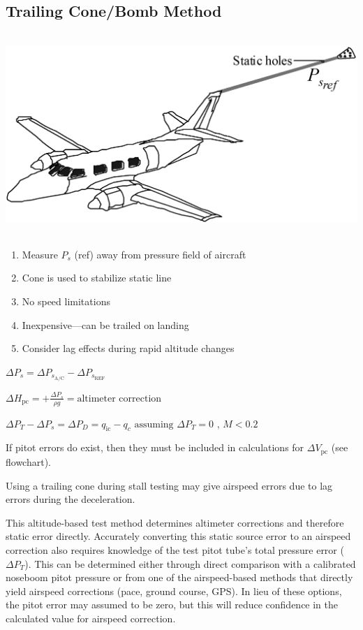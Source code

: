 \documentclass[
]{book}
\providecommand{\tightlist}{%
  \setlength{\itemsep}{0pt}\setlength{\parskip}{0pt}}
\begin{document}
\hypertarget{trailing-conebomb-method}{%
\subsection{Trailing Cone/Bomb Method}\label{trailing-conebomb-method}}

\includegraphics[width=5.9375in,height=3in]{media/04/image23.png}

\begin{enumerate}
\def\labelenumi{\arabic{enumi}.}
\tightlist
\item
  Measure \(P_s\) (ref) away from pressure field of aircraft
\item
  Cone is used to stabilize static line
\item
  No speed limitations
\item
  Inexpensive---can be trailed on landing
\item
  Consider lag effects during rapid altitude changes
\end{enumerate}

\(\Delta P_s = \Delta P_{s_{\mathrm{A/C}}} - \Delta P_{s_{\mathrm{REF}}}\)

\(\Delta H_{\mathrm{pc}} = +\frac{\Delta P_s}{\rho g} = \textrm{altimeter correction}\)

\(\Delta P_T - \Delta P_s = \Delta P_D = q_{\mathrm{ic}} - q_c \text{ assuming } \Delta P_T = 0 \text{ , } M < 0.2\)

If pitot errors do exist, then they must be included in calculations for \(\Delta V_{\mathrm{pc}}\) (see flowchart).

Using a trailing cone during stall testing may give airspeed errors due to lag errors during the deceleration.

This altitude-based test method determines altimeter corrections and therefore static error directly. Accurately converting this static source error to an airspeed correction also requires knowledge of the test pitot tube's total pressure error (\(\Delta P_T\)). This can be determined either through direct comparison with a calibrated noseboom pitot pressure or from one of the airspeed-based methods that directly yield airspeed corrections (pace, ground course, GPS). In lieu of these options, the pitot error may assumed to be zero, but this will reduce confidence in the calculated value for airspeed correction.
\end{document}

